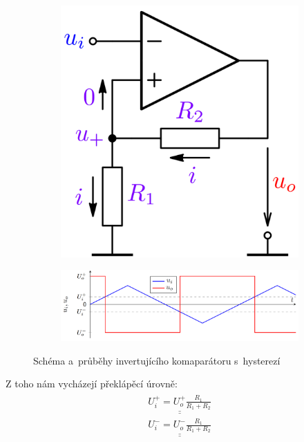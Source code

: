 \documentclass[a4paper,12pt]{article}   %
\begin{document}
\begin{figure}[h!]
    \centering
    \begin{subfigure}{.3\textwidth}
        \centering
        \includegraphics[width=\textwidth]{komparator-invert.PNG}
    \end{subfigure}
    \begin{subfigure}{.65\textwidth}
        \centering
        \includegraphics[width=\textwidth]{komparator-invert-graf.PNG}
    \end{subfigure}
    \caption{Schéma a~průběhy invertujícího komaparátoru s~hysterezí}
    \label{fig:invert:komp}
\end{figure}

Z toho nám vycházejí překlápěcí úrovně:\\
\begin{gather}
\begin{aligned}
    \underline{\underline{U_i^+ = U_o^+\frac{R_1}{R_1 + R_2}}}\\
    \underline{\underline{U_i^- = U_o^-\frac{R_1}{R_1 + R_2}}}
\end{aligned}
\end{gather}
\end{document}
